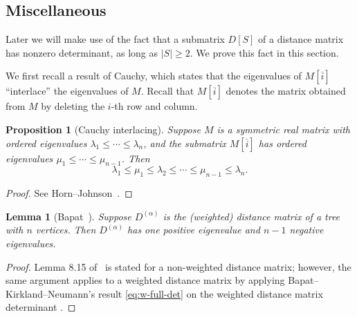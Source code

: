 \documentclass{amsart}
\newtheorem{prop}[thm]{Proposition}
\newtheorem{lem}[thm]{Lemma}
\theoremstyle{definition}
\newcommand{\Da}{{D^{(\alpha)}}}
\begin{document}
\subsection{Miscellaneous}

Later we will make use of the fact that a submatrix $D[S]$ of a distance matrix has nonzero determinant, as long as $|S| \geq 2$.
We prove this fact in this section.

We first recall a result of Cauchy, which states that the eigenvalues of $M[\overline{i}]$ ``interlace'' the eigenvalues of $M$.
Recall that $M[\overline{i}]$ denotes the matrix obtained from $M$ by deleting the $i$-th row and column.

\begin{prop}[Cauchy interlacing]
\label{prop:cauchy-interlacing}
Suppose $M$ is a symmetric real matrix 
with ordered eigenvalues $\lambda_1 \leq \cdots \leq \lambda_n$, 
and  the submatrix $M[\overline{i}]$ has ordered eigenvalues $\mu_1 \leq \cdots \leq \mu_{n-1}$.
Then
\[
	\lambda_1 \leq \mu_1 \leq \lambda_2 \leq \cdots \leq \mu_{n-1} \leq \lambda_n.
\]
\end{prop}
\begin{proof}
See Horn--Johnson~\cite[Theorem 4.3.17]{horn-johnson}.
\end{proof}

\begin{lem}[{Bapat~\cite[Lemma 8.15]{bapat}}]
\label{lem:dist-signature}
Suppose $\Da$ is the (weighted) distance matrix of a tree with $n$ vertices. 
Then $\Da$ has one positive eigenvalue and $n - 1$ negative eigenvalues.
\end{lem}
\begin{proof}
Lemma 8.15 of~\cite{bapat} is stated for a non-weighted distance matrix;
however, the same argument applies to a weighted distance matrix by applying Bapat--Kirkland--Neumann's result \eqref{eq:w-full-det} on the weighted distance matrix determinant \cite[Corollary 2.5]{bapat-kirkland-neumann}. 
\end{proof}
\end{document}
